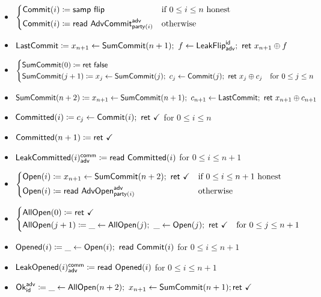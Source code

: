 \begin{itemize}
\item {\color{blue} $\begin{cases*} \Commit(i) \coloneqq \samp{\flip} & \text{if $0 \leq i \leq n$ honest} \\ \Commit(i) \coloneqq \read{\AdvCommit^\adv_{\party(i)}} & \text{otherwise} \end{cases*}$}
\item {\color{blue} $\LastCommit \coloneqq x_{n+1} \leftarrow \SumCommit(n+1); \ f \leftarrow \LeakFlip^\id_\adv; \ \ret{x_{n+1} \oplus f}$}
\item {\color{blue} $\begin{cases*} \SumCommit(0) \coloneqq \ret{\false} & \\ \SumCommit(j+1) \coloneqq x_j \leftarrow \SumCommit(j); \ c_j \leftarrow \Commit(j); \ \ret{x_j \oplus c_j} & \text{for $0 \leq j \leq n$} \end{cases*}$}
\item {\color{blue} $\SumCommit(n+2) \coloneqq x_{n+1} \leftarrow \SumCommit(n+1); \ c_{n+1} \leftarrow \LastCommit; \ \ret{x_{n+1} \oplus c_{n+1}}$}
\item {\color{magenta} $\mathsf{Committed}(i) \coloneqq c_j \leftarrow \mathsf{Commit}(i); \ \mathsf{ret} \ \checkmark$ for $0 \leq i \leq n$}
\item {\color{magenta} $\mathsf{Committed}(n+1) \coloneqq \mathsf{ret} \ \checkmark$}
\item {\color{magenta} $\mathsf{LeakCommitted}(i)^{\mathsf{comm}}_{\mathsf{adv}} \coloneqq \mathsf{read} \ \mathsf{Committed}(i)$ for $0 \leq i \leq n+1$}
\item {\color{teal} $\begin{cases*} \Open(i) \coloneqq x_{n+1} \leftarrow \SumCommit(n+2); \ \ret{\checkmark} & \text{if $0 \leq i \leq n+1$ honest} \\ \Open(i) \coloneqq \read{\AdvOpen^\adv_{\party(i)}} & \text{otherwise} \end{cases*}$}
\item {\color{teal} $\begin{cases*} \AllOpen(0) \coloneqq \ret{\checkmark} & \\ \AllOpen(j+1) \coloneqq \_ \leftarrow \AllOpen(j); \ \_ \leftarrow \Open(j); \ \ret{\checkmark} & \text{for $0 \leq j \leq n+1$} \end{cases*}$}
\item {\color{red} $\mathsf{Opened}(i) \coloneqq \_ \leftarrow \mathsf{Open}(i); \ \mathsf{read} \ \mathsf{Commit}(i)$ for $0 \leq i \leq n+1$}
\item {\color{red} $\mathsf{LeakOpened}(i)^{\mathsf{comm}}_{\mathsf{adv}} \coloneqq \mathsf{read} \ \mathsf{Opened}(i)$ for $0 \leq i \leq n+1$}
\item $\mathsf{Ok}^{\mathsf{adv}}_{\mathsf{id}} \coloneqq \_ \leftarrow \mathsf{AllOpen}(n+2); \ x_{n+1} \leftarrow \mathsf{SumCommit}(n+1); \mathsf{ret} \ \checkmark$
\end{itemize}

